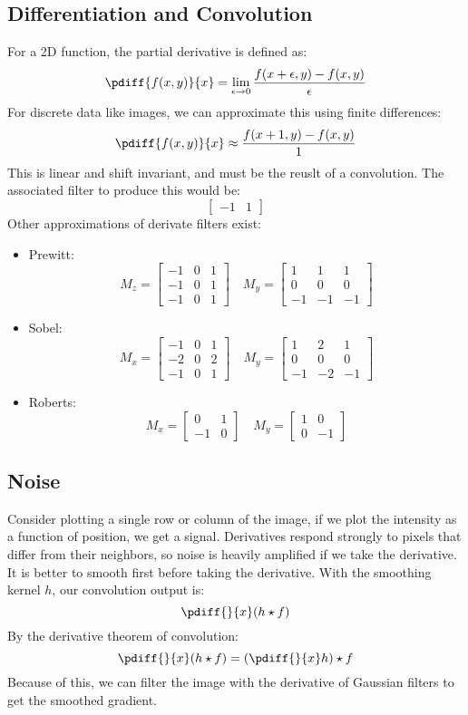 \documentclass{math}
\begin{document}
\subsection*{Differentiation and Convolution}
For a 2D function, the partial derivative is defined as:
\[ \pdiff{f(x,y)}{x} =
  \lim_{\epsilon\to0}\frac{f(x+\epsilon,y)-f(x,y)}{\epsilon} \]
For discrete data like images, we can approximate this using finite differences:
\[ \pdiff{f(x,y)}{x} \approx \frac{f(x+1,y)-f(x,y)}{1} \]
This is linear and shift invariant, and must be the reuslt of a convolution. The
associated filter to produce this would be:
\[ \begin{bmatrix} -1 & 1 \end{bmatrix} \]
Other approximations of derivate filters exist:
\begin{itemize}
  \item Prewitt:
  \[ M_z = \begin{bmatrix}
    -1 & 0 & 1 \\
    -1 & 0 & 1 \\
    -1 & 0 & 1
  \end{bmatrix} \quad
  M_y = \begin{bmatrix}
    1 & 1 & 1 \\
    0 & 0 & 0 \\
    -1 & -1 & -1
  \end{bmatrix} \]
  \item Sobel:
  \[ M_x = \begin{bmatrix}
    -1 & 0 & 1 \\
    -2 & 0 & 2 \\
    -1 & 0 & 1
  \end{bmatrix} \quad
  M_y = \begin{bmatrix}
    1 & 2 & 1 \\
    0 & 0 & 0 \\
    -1 & -2 & -1
  \end{bmatrix} \]
  \item Roberts:
  \[ M_x = \begin{bmatrix}
    0 & 1 \\
    -1 & 0
  \end{bmatrix} \quad
  M_y = \begin{bmatrix}
    1 & 0 \\
    0 & -1
  \end{bmatrix} \]
\end{itemize}

\subsection*{Noise}
Consider plotting a single row or column of the image, if we plot the intensity
as a function of position, we get a signal. Derivatives respond strongly to
pixels that differ from their neighbors, so noise is heavily amplified if we
take the derivative. It is better to smooth first before taking the derivative.
With the smoothing kernel \( h \), our convolution output is:
\[ \pdiff{}{x}(h\star f) \]
By the derivative theorem of convolution:
\[ \pdiff{}{x}(h\star f) = (\pdiff{}{x}h)\star f \]
Because of this, we can filter the image with the derivative of Gaussian filters
to get the smoothed gradient.
\end{document}
